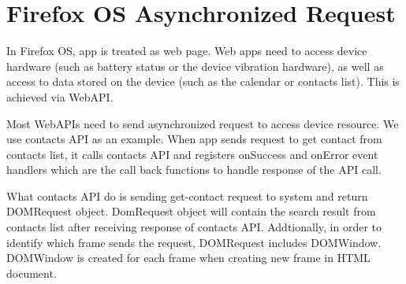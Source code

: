 \documentclass[12pt]{article}
\begin{document}
\section*{Firefox OS Asynchronized Request}
In Firefox OS, app is treated as web page. Web apps need to access device hardware (such as battery status or the device vibration hardware), as well as access to data stored on the device (such as the calendar or contacts list). This is achieved via WebAPI.

Most WebAPIs need to send asynchronized request to access device resource. We use contacts API as an example. When app sends request to get contact from contacts list,  it calls contacts API and registers onSuccess and onError event handlers which are the call back functions to handle response of the API call. 

What contacts API do is sending get-contact request to system and return DOMRequest object. DomRequest object will contain the search result from contacts list after receiving response of contacts API. Addtionally, in order to identify which frame sends the request, DOMRequest includes DOMWindow. DOMWindow is created for each frame when creating new frame in HTML document.     
\end{document}
